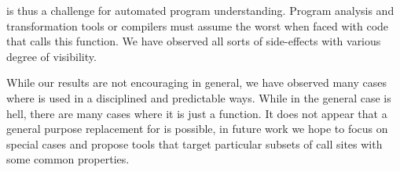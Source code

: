 \documentclass[acmsmall, screen]{acmart}
\begin{document}
\Eval is thus a challenge for automated program understanding. Program analysis
and transformation tools or compilers must assume the worst when faced with code
that calls this function. We have observed all sorts of side-effects with
various degree of visibility.

While our results are not encouraging in general, we have observed many cases
where \eval is used in a disciplined and predictable ways. While in the general
case \eval is hell, there are many cases where it is just a function. It does
not appear that a general purpose replacement for \eval is possible, in future
work we hope to focus on special cases and propose tools that target particular
subsets of call sites with some common properties.


\end{document}
